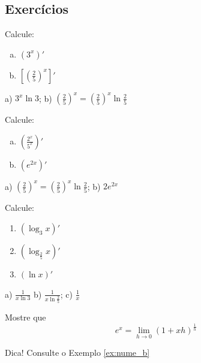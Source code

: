 \subsection*{Exercícios}

\begin{exer}
  Calcule:
  \begin{enumerate}[a)]
  \item $\displaystyle \left(3^x\right)'$
  \item $\displaystyle \left[\left(\frac{2}{5}\right)^x\right]'$
  \end{enumerate}
\end{exer}
\begin{resp}
  a) $3^x\ln 3$; b) $\left(\frac{2}{5}\right)^x = \left(\frac{2}{5}\right)^x\ln\frac{2}{5}$
\end{resp}

\begin{exer}
  Calcule:
  \begin{enumerate}[a)]
  \item $\displaystyle \left(\frac{2^x}{5^x}\right)'$\\
  \item $\displaystyle \left(e^{2x}\right)'$
  \end{enumerate}
\end{exer}
\begin{resp}
  a) $\left(\frac{2}{5}\right)^x = \left(\frac{2}{5}\right)^x\ln\frac{2}{5}$; b) $2e^{2x}$
\end{resp}

\begin{exer}
  Calcule:
  \begin{enumerate}
  \item $\displaystyle\left(\log_3 x\right)'$
  \item $\displaystyle\left(\log_{\frac{2}{5}} x\right)'$
  \item $\displaystyle (\ln x)'$
  \end{enumerate}
\end{exer}
\begin{resp}
  a) $\displaystyle \frac{1}{x\ln 3}$ b) $\displaystyle\frac{1}{x\ln \frac{2}{5}}$; c) $\frac{1}{x}$
\end{resp}

\begin{exer}\label{exer:cap_deriv_ex}
  Mostre que
  \begin{equation}
    e^x = \lim_{h\to 0}\left(1 + xh\right)^{\frac{1}{h}}
  \end{equation}
\end{exer}
\begin{resp}
  Dica! Consulte o Exemplo \ref{ex:nume_b}
\end{resp}

